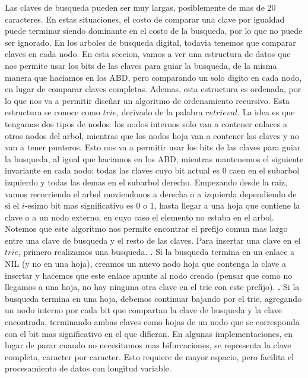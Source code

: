 \documentclass[10pt,a4paper]{article}
\begin{document}
Las claves de busqueda pueden ser muy largas, posiblemente de mas de 20 caracteres. En estas situaciones, el costo de comparar una clave por igualdad puede terminar siendo dominante en el costo de la busqueda, por lo que no puede ser ignorado. En los arboles de busqueda digital, todavia tenemos que comparar claves en cada nodo. En esta seccion, vamos a ver una estructura de datos que nos permite usar los bits de las claves para guiar la busqueda, de la misma manera que haciamos en los ABD, pero comparando un solo digito en cada nodo, en lugar de comparar claves completas. Ademas, esta estructura es ordenada, por lo que nos va a permitir diseñar un algoritmo de ordenamiento recursivo.
\newline
\newline
Esta estructura se conoce como $trie$, derivado de la palabra $retrieval$. La idea es que tengamos dos tipos de nodos: los nodos internos solo van a contener enlaces a otros nodos del arbol, mientras que los nodos hoja van a contener las claves y no van a tener punteros. Esto nos va a permitir usar los bits de las claves para guiar la busqueda, al igual que haciamos en los ABD, mientras mantenemos el siguiente invariante en cada nodo: todas las claves cuyo bit actual es 0 caen en el subarbol izquierdo y todas las demas en el subarbol derecho. Empezando desde la raiz, vamos recorriendo el arbol moviendonos a derecha o a izquierda dependiendo de si el $i$-esimo bit mas significativo es 0 o 1, hasta llegar a una hoja que contiene la clave o a un nodo externo, en cuyo caso el elemento no estaba en el arbol. Notemos que este algoritmo nos permite encontrar el prefijo comun mas largo entre una clave de busqueda y el resto de las claves.
\newline
\newline
Para insertar una clave en el $trie$, primero realizamos una busqueda.
\newline
\newline
\textbf{.} Si la busqueda termina en un enlace a NIL (y no en una hoja), creamos un nuevo nodo hoja que contenga la clave a insertar y hacemos que este enlace apunte al nodo creado (pensar que como no llegamos a una hoja, no hay ninguna otra clave en el trie con este prefijo).
\newline
\newline
\textbf{.} Si la busqueda termina en una hoja, debemos continuar bajando por el trie, agregando un nodo interno por cada bit que compartan la clave de busqueda y la clave encontrada, terminando ambas claves como hojas de un nodo que se corresponda con el bit mas significativo en el que difieran. En algunas implementaciones, en lugar de parar cuando no necesitamos mas bifurcaciones, se representa la clave completa, caracter por caracter. Esto requiere de mayor espacio, pero facilita el procesamiento de datos con longitud variable.
\end{document}
